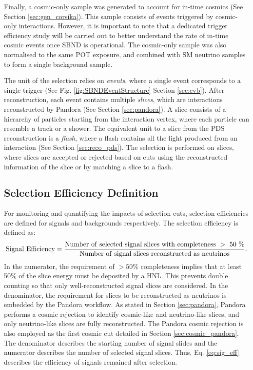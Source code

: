 Finally, a cosmic-only sample was generated to account for in-time cosmics (See Section \ref{sec:gen_corsika}).
This sample consists of events triggered by cosmic-only interactions.
However, it is important to note that a dedicated trigger efficiency study will be carried out to better understand the rate of in-time cosmic events once SBND is operational.
The cosmic-only sample was also normalised to the same POT exposure, and combined with SM neutrino samples to form a single background sample.  

The unit of the selection relies on \textit{events}, where a single event corresponds to a single trigger (See Fig. \ref{fig:SBNDEventStructure} Section \ref{sec:evb}).
After reconstruction, each event contains multiple \textit{slices}, which are interactions reconstructed by Pandora (See Section \ref{sec:pandora}).
A slice consists of a hierarchy of particles starting from the interaction vertex, where each particle can resemble a track or a shower.
The equivalent unit to a slice from the PDS reconstruction is a \textit{flash}, where a flash contains all the light produced from an interaction (See Section \ref{sec:reco_pds}).
The selection is performed on slices, where slices are accepted or rejected based on cuts using the reconstructed information of the slice or by matching a slice to a flash.


\subsection{Selection Efficiency Definition}
\label{sec:select_eff}

For monitoring and quantifying the impacts of selection cuts, selection efficiencies are defined for signals and backgrounds respectively.
The selection efficiency is defined as:
\begin{equation}
	\label{eq:sig_eff}
	\mathrm{Signal\ Efficiency = \frac{Number\ of\ selected\ signal\ slices\ with\ completeness\ >\ 50\ \%}{Number\ of\ signal\ slices\ reconstructed\ as\ neutrinos}}. \\
\end{equation}
In the numerator, the requirement of $> 50\%$ completeness implies that at least 50\% of the slice energy must be deposited by a HNL.
This prevents double counting so that only well-reconstructed signal slices are considered.
In the denominator, the requirement for slices to be reconstructed as neutrinos is embedded by the Pandora workflow.
As stated in Section \ref{sec:pandora}, Pandora performs a cosmic rejection to identify cosmic-like and neutrino-like slices, and only neutrino-like slices are fully reconstructed.
The Pandora cosmic rejection is also employed as the first cosmic cut detailed in Section \ref{sec:cosmic_pandora}.
The denominator describes the starting number of signal slides and the numerator describes the number of selected signal slices.
Thus, Eq. \ref{eq:sig_eff} describes the efficiency of signals remained after selection. 

